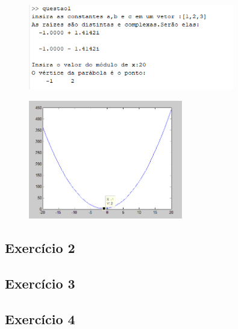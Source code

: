 \documentclass[12pt]{article}
\begin{document}
\begin{itemize}
    \begin{figure}[H]
        \begin{center}
            \includegraphics[width=0.8\textwidth]{outputq1-1.png}
        \end{center}
    \end{figure}
    \begin{figure}[H]
        \begin{center}
            \includegraphics[width=0.6\textwidth]{graficoq1-1.png}
        \end{center}
    \end{figure}
\end{itemize}

\subsection{Exercício 2}

\subsection{Exercício 3}

\subsection{Exercício 4}
\end{document}
